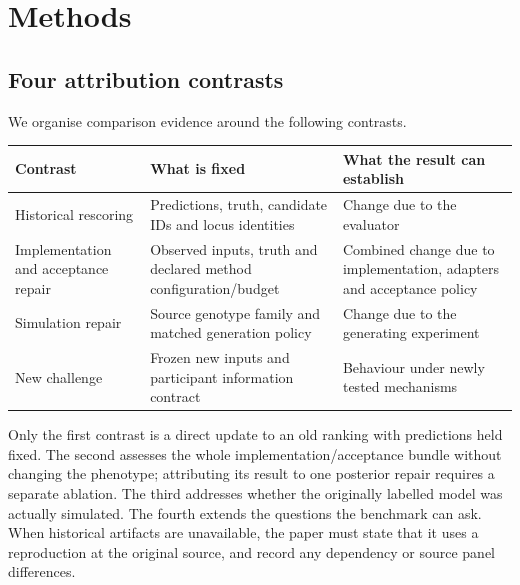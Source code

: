 \documentclass[
  british,
  10pt,
]{article}
\newcounter{none} %
\begin{document}
\section{Methods}\label{methods}

\subsection{Four attribution
contrasts}\label{four-attribution-contrasts}

We organise comparison evidence around the following contrasts.

{\def\LTcaptype{none} %
\begin{longtable}[]{@{}
  >{\raggedright\arraybackslash}p{}
  >{\raggedright\arraybackslash}p{}
  >{\raggedright\arraybackslash}p{}@{}}
\toprule\noalign{}
\begin{minipage}[b]{\linewidth}\raggedright
Contrast
\end{minipage} & \begin{minipage}[b]{\linewidth}\raggedright
What is fixed
\end{minipage} & \begin{minipage}[b]{\linewidth}\raggedright
What the result can establish
\end{minipage} \\
\midrule\noalign{}
\endhead
\bottomrule\noalign{}
\endlastfoot
Historical rescoring & Predictions, truth, candidate IDs and locus
identities & Change due to the evaluator \\
Implementation and acceptance repair & Observed inputs, truth and
declared method configuration/budget & Combined change due to
implementation, adapters and acceptance policy \\
Simulation repair & Source genotype family and matched generation policy
& Change due to the generating experiment \\
New challenge & Frozen new inputs and participant information contract &
Behaviour under newly tested mechanisms \\
\end{longtable}
}

Only the first contrast is a direct update to an old ranking with
predictions held fixed. The second assesses the whole
implementation/acceptance bundle without changing the phenotype;
attributing its result to one posterior repair requires a separate
ablation. The third addresses whether the originally labelled model was
actually simulated. The fourth extends the questions the benchmark can
ask. When historical artifacts are unavailable, the paper must state
that it uses a reproduction at the original source, and record any
dependency or source panel differences.
\end{document}
